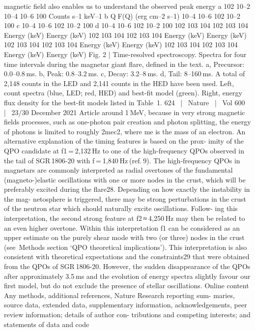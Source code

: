 magnetic field also enables us to understand the observed peak energy
a
102
10–2
10–4
10–6
100
Counts s–1 keV–1
b
 QF(Q) (erg cm–2 s–1)
10–4
10–6
102
10–2
100
c
10–4
10–6
102
10–2
100
d
10–4
10–6
102
10–2
100
102
103
104
102
103
104
Energy (keV)
Energy (keV)
102
103
104
102
103
104
Energy (keV)
Energy (keV)
102
103
104
102
103
104
Energy (keV)
Energy (keV)
102
103
104
102
103
104
Energy (keV)
Energy (keV)
Fig. 2 | Time-resolved spectroscopy. Spectra for four time intervals during
the magnetar giant flare, defined in the text. a, Precursor: 0.0–0.8 ms. b, Peak:
0.8–3.2 ms. c, Decay: 3.2–8 ms. d, Tail: 8–160 ms. A total of 2,148 counts in the
LED and 2,141 counts in the HED have been used. Left, count spectra (blue, LED;
red, HED) and best-fit model (green). Right, energy flux density for the best-fit
models listed in Table 1.
624  |  Nature  |  Vol 600  |  23/30 December 2021
Article
around 1 MeV, because in very strong magnetic fields processes, such as
one-photon pair creation and photon splitting, the energy of photons
is limited to roughly 2mec2, where me is the mass of an electron.
An alternative explanation of the timing features is based on the prox-
imity of the QPO candidate at f1 = 2,132 Hz to one of the high-frequency
QPOs observed in the tail of SGR 1806-20 with f = 1,840 Hz (ref. 9).
The high-frequency QPOs in magnetars are commonly interpreted as
radial overtones of the fundamental (magneto-)elastic oscillations
with one or more nodes in the crust, which will be preferably excited
during the flare28. Depending on how exactly the instability in the mag-
netosphere is triggered, there may be strong perturbations in the crust
of the neutron star which should naturally excite oscillations. Follow-
ing this interpretation, the second strong feature at f2 ≈ 4,250 Hz may
then be related to an even higher overtone. Within this interpretation
f1 can be considered as an upper estimate on the purely shear mode
with two (or three) nodes in the crust (see Methods section ‘QPO
theoretical implications’). This interpretation is also consistent with
theoretical expectations and the constraints29 that were obtained
from the QPOs of SGR 1806-20. However, the sudden disappearance
of the QPOs after approximately 3.5 ms and the evolution of energy
spectra slightly favour our first model, but do not exclude the presence
of stellar oscillations.
Online content
Any methods, additional references, Nature Research reporting sum-
maries, source data, extended data, supplementary information,
acknowledgements, peer review information; details of author con-
tributions and competing interests; and statements of data and code

